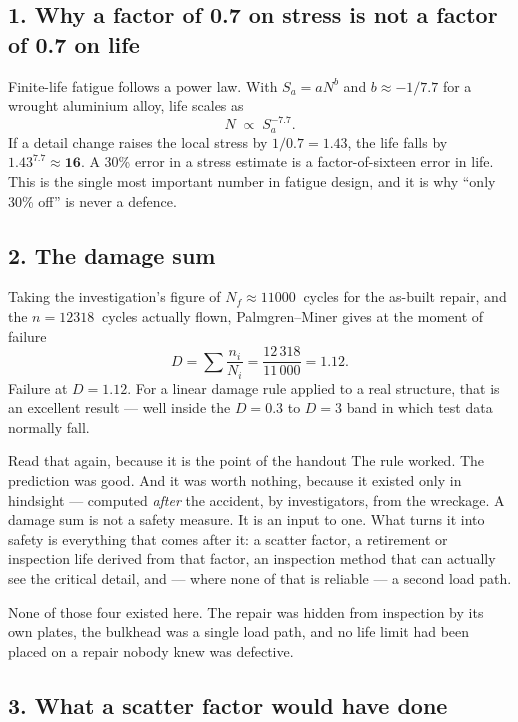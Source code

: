 \documentclass[11pt,a4paper]{article}
\begin{document}
\subsection*{1. Why a factor of 0.7 on stress is not a factor of 0.7 on life}

Finite-life fatigue follows a power law. With $S_a = a N^{b}$ and $b\approx-1/7.7$ for a wrought aluminium alloy, life scales as
\[
N \;\propto\; S_a^{-7.7}.
\]
If a detail change raises the local stress by $1/0.7 = 1.43$, the life falls by $1.43^{7.7}\approx \mathbf{16}$. A 30\% error in a stress estimate is a factor-of-sixteen error in life. This is the single most important number in fatigue design, and it is why ``only 30\% off'' is never a defence.

\subsection*{2. The damage sum}

Taking the investigation's figure of $N_f\approx\SI{11000}{}$ cycles for the as-built repair, and the $n=\SI{12318}{}$ cycles actually flown, Palmgren--Miner gives at the moment of failure
\[
D=\sum\frac{n_i}{N_i}=\frac{12\,318}{11\,000}=\mathbf{1.12}.
\]
Failure at $D=1.12$. For a linear damage rule applied to a real structure, that is an excellent result --- well inside the $D=0.3$ to $D=3$ band in which test data normally fall.

\begin{aerobox}{Read that again, because it is the point of the handout}
The rule worked. The prediction was good. And it was worth nothing, because it existed only in hindsight --- computed \emph{after} the accident, by investigators, from the wreckage. A damage sum is not a safety measure. It is an input to one. What turns it into safety is everything that comes after it: a scatter factor, a retirement or inspection life derived from that factor, an inspection method that can actually see the critical detail, and --- where none of that is reliable --- a second load path.

None of those four existed here. The repair was hidden from inspection by its own plates, the bulkhead was a single load path, and no life limit had been placed on a repair nobody knew was defective.
\end{aerobox}

\subsection*{3. What a scatter factor would have done}
\end{document}
